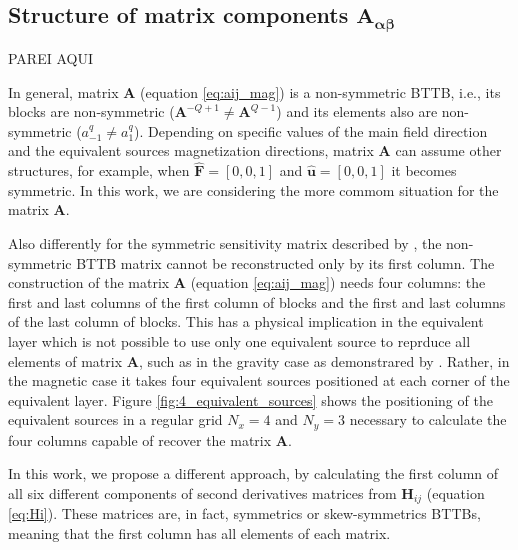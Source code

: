
\subsection{Structure of matrix components $\mathbf{A_{\boldsymbol{\alpha\beta}}}$}

PAREI AQUI

In general, matrix $\mathbf{A}$ (equation \ref{eq:aij_mag}) is a non-symmetric BTTB, i.e., its blocks are non-symmetric ($\mathbf{A}^{-Q+1} \neq \mathbf{A}^{Q-1} $) and its elements also are non-symmetric ($a^{q}_{-1} \neq a^{q}_{1}$). Depending on specific values of the main field direction and the equivalent sources magnetization directions, matrix $\mathbf{A}$ can assume other structures, for example, when $\hat{\mathbf{F}} = [0, 0, 1]$ and $\hat{\mathbf{u}} = [0, 0, 1]$ it becomes symmetric. In this work, we are considering the more commom situation for the matrix $\mathbf{A}$.

Also differently for the symmetric sensitivity matrix described by \cite{takahashi2020convolutional}, the non-symmetric BTTB matrix cannot be reconstructed only by its first column. The construction of the matrix $\mathbf{A}$ (equation \ref{eq:aij_mag}) needs four columns: the first and last columns of the first column of blocks and the first and last columns of the last column of blocks. This has a physical implication in the equivalent layer which is not possible to use only one equivalent source to reprduce all elements of matrix $\mathbf{A}$, such as in the gravity case as demonstrared by \cite{takahashi2020convolutional}. Rather, in the magnetic case it takes four equivalent sources positioned at each corner of the equivalent layer. Figure \ref{fig:4_equivalent_sources} shows the positioning of the equivalent sources in a regular grid $N_x = 4$
and $N_y = 3$ necessary to calculate the four columns capable of recover the matrix $\mathbf{A}$.

In this work, we propose a different approach, by calculating the first column of all six different components of second derivatives matrices from $\mathbf{H}_{ij}$ (equation \ref{eq:Hi}). These matrices are, in fact, symmetrics or skew-symmetrics BTTBs, meaning that the first column has all elements of each matrix.




